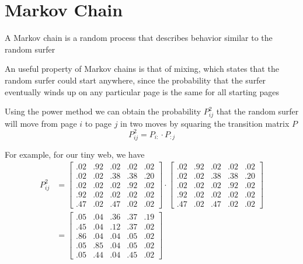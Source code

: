 \documentclass[8pt,a4paper,compress]{beamer}
\begin{document}
\section{Markov Chain}
\begin{frame}[fragile]
\pause

A Markov chain is a random process that describes behavior similar to the random surfer

\pause\bigskip

An useful property of Markov chains is that of mixing, which states that the random surfer could start anywhere, since the probability that the surfer eventually winds up on any particular page is the same for all starting pages

\pause\bigskip

Using the power method we can obtain the probability $P^2_{ij}$ that the random surfer will move from page $i$ to page $j$ in two moves by squaring the transition matrix $P$ $$P^2_{ij} = P_{i:} \cdot P_{:j}$$ 

\pause\bigskip

For example, for our tiny web, we have
\begin{align*}
P^2_{ij} &= 
\begin{bmatrix}
.02 & .92 & .02 & .02 & .02 \\
.02 & .02 & .38 & .38 & .20 \\
.02 & .02 & .02 & .92 & .02 \\
.92 & .02 & .02 & .02 & .02 \\
.47 & .02 & .47 & .02 & .02
\end{bmatrix}
\cdot
\begin{bmatrix}
.02 & .92 & .02 & .02 & .02 \\
.02 & .02 & .38 & .38 & .20 \\
.02 & .02 & .02 & .92 & .02 \\
.92 & .02 & .02 & .02 & .02 \\
.47 & .02 & .47 & .02 & .02
\end{bmatrix} \\
& =
\begin{bmatrix}
.05 & .04 & .36 & .37 & .19 \\
.45 & .04 & .12 & .37 & .02 \\
.86 & .04 & .04 & .05 & .02 \\
.05 & .85 & .04 & .05 & .02 \\
.05 & .44 & .04 & .45 & .02
\end{bmatrix} 
\end{align*}

\end{frame}
\end{document}
